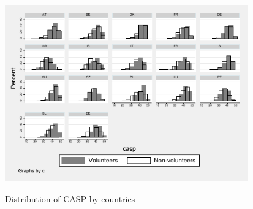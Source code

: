 \documentclass[10pt, letterpaper]{article}
\begin{document}
\begin{spacing}{1.4}
\begin{spacing}{.9}
\begin{figure}[H]
 \includegraphics[height=3in]{hist_casp.pdf}
 \centering
 \label{fig:hist_casp}
\caption{Distribution of CASP by countries}
\end{figure}

%
%	 


%	 

 
\begin{spacing}{.9}
\centering 
\begin{scriptsize} 
	 
      \label{DescT0} 
\end{scriptsize}
\end{spacing}

\begin{spacing}{.9}
\centering 
\begin{scriptsize} 
	 
      \label{DescT1} 
\end{scriptsize}
\end{spacing}


\end{spacing}
\end{spacing}
\end{document}
